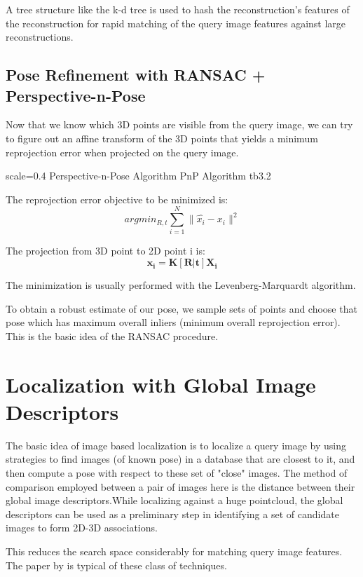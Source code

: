 A tree structure like the k-d tree is used to hash the reconstruction's features of the reconstruction for rapid matching of the query image features against large reconstructions.

\subsection{Pose Refinement with RANSAC + Perspective-n-Pose}
Now that we know which 3D points are visible from the query image, we can try to figure out an affine transform of the 3D points that yields a minimum reprojection error when projected on the query image. 

{scale=0.4}%
{Perspective-n-Pose Algorithm}%
{PnP Algorithm}%
{tb3.2} %

The reprojection error objective to be minimized is:
\[argmin_{R, t}\sum_{i=1}^{N}\|\hat{x_i} - x_i\|^2\]

The projection from 3D point to 2D point i is:
\[\mathbf{x_i} = \mathbf{K[R|t]X_i}\]

The minimization is usually performed with the Levenberg-Marquardt algorithm. 

To obtain a robust estimate of our pose, we sample sets of points and choose that pose which has maximum overall inliers (minimum overall reprojection error). This is the basic idea of the RANSAC procedure.

\section{Localization with Global Image Descriptors}
The basic idea of image based localization is to localize a query image by using strategies to find images (of known pose) in a database that are closest to it, and then compute a pose with respect to these set of "close" images. The method of comparison employed between a pair of images here is the distance between their global image descriptors.While localizing against a huge pointcloud, the global descriptors can be used as a preliminary step in identifying a set of candidate images to form 2D-3D associations. 

This reduces the search space considerably for matching query image features. The paper by \cite{Sattler2012} is typical of these class of techniques.


